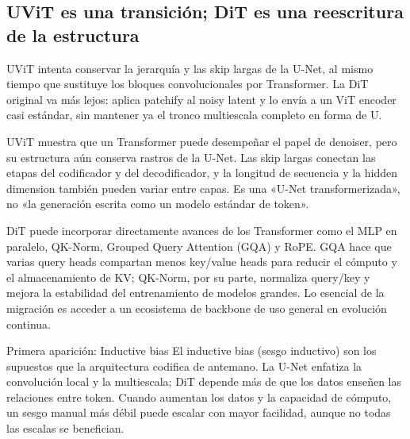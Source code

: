 \subsection{UViT es una transición; DiT es una reescritura de la estructura}

UViT intenta conservar la jerarquía y las skip largas de la U-Net, al mismo tiempo que sustituye los bloques convolucionales por Transformer. La DiT original va más lejos: aplica patchify al noisy latent y lo envía a un ViT encoder casi estándar, sin mantener ya el tronco multiescala completo en forma de U.


UViT muestra que un Transformer puede desempeñar el papel de denoiser, pero su estructura aún conserva rastros de la U-Net. Las skip largas conectan las etapas del codificador y del decodificador, y la longitud de secuencia y la hidden dimension también pueden variar entre capas. Es una «U-Net transformerizada», no «la generación escrita como un modelo estándar de token».


DiT puede incorporar directamente avances de los Transformer como el MLP en paralelo, QK-Norm, Grouped Query Attention (GQA) y RoPE. GQA hace que varias query heads compartan menos key/value heads para reducir el cómputo y el almacenamiento de KV; QK-Norm, por su parte, normaliza query/key y mejora la estabilidad del entrenamiento de modelos grandes. Lo esencial de la migración es acceder a un ecosistema de backbone de uso general en evolución continua.


\begin{knowledgebox}{Primera aparición: Inductive bias}
El inductive bias (sesgo inductivo) son los supuestos que la arquitectura codifica de antemano. La U-Net enfatiza la convolución local y la multiescala; DiT depende más de que los datos enseñen las relaciones entre token. Cuando aumentan los datos y la capacidad de cómputo, un sesgo manual más débil puede escalar con mayor facilidad, aunque no todas las escalas se benefician.
\end{knowledgebox}


